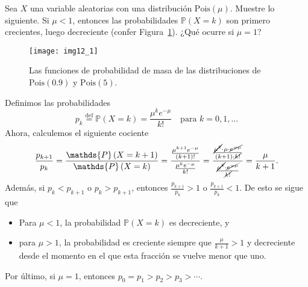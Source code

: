 \question
	Sea $X$ una variable aleatorias con una distribución $\mathrm{Pois}\left(\mu\right)$. Muestre lo siguiente. Si $\mu<1$, entonces las probabilidades $\mathds{P}\left(X=k\right)$ son primero crecientes, luego decreciente (confer Figura~\ref{fig:12_1}). ¿Qué ocurre si $\mu=1$?
	
	\begin{figure}[ht!]
		\centering
		\texttt{[image: img12\_1]}
		\caption{Las funciones de probabilidad de masa de las distribuciones de $\mathrm{Pois}\left(0.9\right)$ y $\mathrm{Pois}\left(5\right)$.}
		\label{fig:12_1}
	\end{figure}

	\begin{solutionordottedlines}
		Definimos las probabilidades
		\begin{equation*}
		p_{k}\stackrel{\text{def}}{=}\mathds{P}\left(X=k\right)=\frac{\mu^{k}e^{-\mu}}{k!}\quad\text{para } k=0,1,\ldots
		\end{equation*}
		Ahora, calculemos el siguiente cociente
		\begin{equation*}
		\frac{p_{k+1}}{p_{k}}
		=\frac{\mathds{P}\left(X=k+1\right)}{\mathds{P}\left(X=k\right)}
		=\frac{\frac{\mu^{k+1}e^{-\mu}}{\left(k+1\right)!}}{\frac{\mu^{k}e^{-\mu}}{k!}}
		=\frac{\frac{\cancel{\mu^{k}}\cdot\mu\cdot \cancel{e^{-\mu}}}{\left(k+1\right)\cdot\cancel{ k!}}}{\frac{\cancel{\mu^{k}}\cdot\cancel{e^{-\mu}}}{\cancel{k!}}}
		=\frac{\mu}{k+1}.
		\end{equation*}
		Además, si $p_{k}<p_{k+1}$ o $p_{k}>p_{k+1}$, entonces $\frac{p_{k+1}}{p_{k}}>1$ o $\frac{p_{k+1}}{p_{k}}<1$. De esto se sigue que
		\begin{itemize}
			\item Para $\mu<1$, la probabilidad $\mathds{P}\left(X=k\right)$ es decreciente, y
			\item para $\mu>1$, la probabilidad es creciente siempre que $\tfrac{\mu}{k+1}>1$ y decreciente desde el momento en el que esta fracción se vuelve menor que uno.
		\end{itemize}
		Por último, si $\mu={1}$, entonces $p_{0}=p_{1}>p_{2}>p_{3}>\cdots$.
	\end{solutionordottedlines}